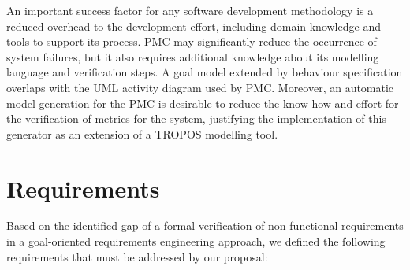 An important success factor for any software development methodology is a reduced overhead to the development effort, including domain knowledge and tools to support its process. PMC may significantly reduce the occurrence of system failures, but it also requires additional knowledge about its modelling language and verification steps. A goal model extended by behaviour specification overlaps with the UML activity diagram used by PMC.  Moreover, an automatic model generation for the PMC is desirable to reduce the know-how and effort for the verification of metrics for the system, justifying the implementation of this generator as an extension of a TROPOS modelling tool.

\section{Requirements}

Based on the identified gap of a formal verification of non-functional requirements in a goal-oriented requirements engineering approach, we defined the following requirements that must be addressed by our proposal:

